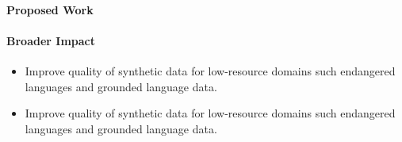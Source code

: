 \paragraph{Proposed Work}


\paragraph{Broader Impact}

\begin{itemize}
    \item {}
        Improve quality of synthetic data for low-resource domains such endangered languages and grounded language data.
    \item {}
        Improve quality of synthetic data for low-resource domains such endangered languages and grounded language data.
\end{itemize}
